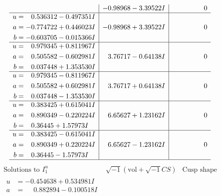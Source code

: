 \documentclass[1p]{elsarticle_modified}
\theoremstyle{definition}
\newcommand{\I}{\sqrt{-1}}
\begin{document}
$$\begin{array}{c|c|c}
 & -0.98968 - 3.39522 I & \phantom{-0.000000 } 0 \\ \hline\begin{aligned}
u &= \phantom{-}0.536312 - 0.497351 I \\
a &= -0.774722 + 0.446023 I \\
b &= -0.603705 - 0.015366 I\end{aligned}
 & -0.98968 + 3.39522 I & \phantom{-0.000000 } 0 \\ \hline\begin{aligned}
u &= \phantom{-}0.979345 + 0.811967 I \\
a &= \phantom{-}0.505582 - 0.602981 I \\
b &= \phantom{-}0.037448 + 1.353530 I\end{aligned}
 & \phantom{-}3.76717 - 0.64138 I & \phantom{-0.000000 } 0 \\ \hline\begin{aligned}
u &= \phantom{-}0.979345 - 0.811967 I \\
a &= \phantom{-}0.505582 + 0.602981 I \\
b &= \phantom{-}0.037448 - 1.353530 I\end{aligned}
 & \phantom{-}3.76717 + 0.64138 I & \phantom{-0.000000 } 0 \\ \hline\begin{aligned}
u &= \phantom{-}0.383425 + 0.615041 I \\
a &= \phantom{-}0.890349 - 0.220224 I \\
b &= \phantom{-}0.36445 + 1.57973 I\end{aligned}
 & \phantom{-}6.65627 + 1.23162 I & \phantom{-0.000000 } 0 \\ \hline\begin{aligned}
u &= \phantom{-}0.383425 - 0.615041 I \\
a &= \phantom{-}0.890349 + 0.220224 I \\
b &= \phantom{-}0.36445 - 1.57973 I\end{aligned}
 & \phantom{-}6.65627 - 1.23162 I & \phantom{-0.000000 } 0\\
 \hline 
 \end{array}$$\newpage$$\begin{array}{c|c|c}  
\text{Solutions to }I^u_{1}& \I (\text{vol} + \sqrt{-1}CS) & \text{Cusp shape}\\
 \hline 
\begin{aligned}
u &= -0.454638 + 0.534981 I \\
a &= \phantom{-}0.882894 - 0.100518 I \\

\end{aligned}
\end{array}$$
\end{document}
